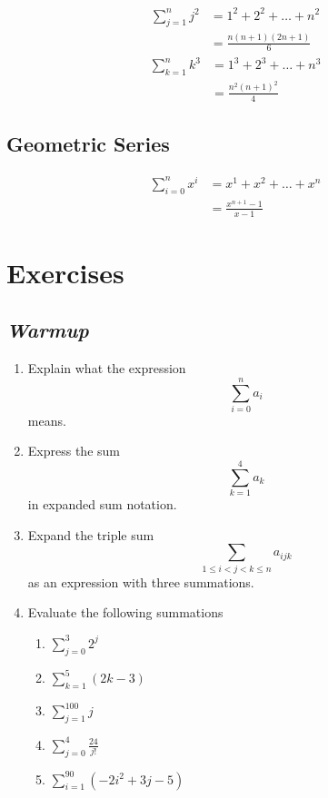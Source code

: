 \documentclass[prereq]{cslesson}
\numberwithin{equation}{section}
\begin{document}
\begin{theorem}
\begin{align*}
    \sum^n_{j=1}j^2&=1^2+2^2+\ldots+n^2\\
    &=\frac{n(n+1)(2n+1)}{6}
\end{align*}
\begin{align*}
    \sum^n_{k=1}k^3&=1^3+2^3+\ldots+n^3\\
    &=\frac{n^2(n+1)^2}{4}
\end{align*}
\end{theorem}

\subsection{Geometric Series}
\begin{theorem}
\begin{align*}
    \sum^n_{i=0}x^i&=x^1+x^2+\ldots+x^n\\
    &=\frac{x^{n+1}-1}{x-1}
\end{align*}
\end{theorem}

\newpage
\section*{Exercises}
\subsection*{\textit{Warmup}}
\begin{enumerate}[listparindent=0.7cm, align=left]
\item Explain what the expression \begin{equation*}\sum^n_{i=0}a_i\end{equation*} means.
\item Express the sum \begin{equation*}\sum^4_{k=1}a_k\end{equation*} in expanded sum notation.
\item Expand the triple sum \begin{equation*}\sum_{1 \leq i < j < k \leq n}a_{ijk}\end{equation*} as an expression with three summations.
\item Evaluate the following summations
\begin{enumerate}[label=(\alph*), listparindent=0.7cm, align=left]
    \item $\sum^3_{j=0}2^j$
    \item $\sum^5_{k=1}(2k-3)$
    \item $\sum^{100}_{j=1}j$
    \item $\sum^{4}_{j=0}{\frac{24}{j!}}$
    \item $\sum^{90}_{i=1}{(-2i^2+3j-5)}$
\end{enumerate}
\end{enumerate}
\end{document}
